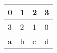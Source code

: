 \begin{tabular}{llll}
\toprule
0 & 1 & 2 & 3 \\
\midrule
3 & 2 & 1 & 0 \\
a & b & c & d \\
\bottomrule
\end{tabular}

